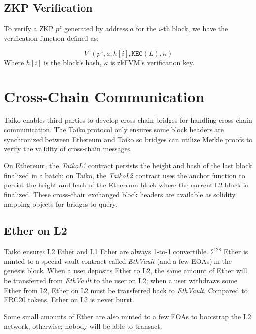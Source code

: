 \documentclass[9pt,oneside]{amsart}
\begin{document}
\begin{multicols}{2}
\subsection{ZKP Verification} To verify a ZKP $p^z$ generated by address $a$ for the $i$-th block, we have the verification function defined as:

\begin{equation}
    V^z(p^z, a, h[i], \texttt{KEC}(L), \kappa)
\end{equation}
Where $h[i]$ is the block's hash, $\kappa$ is  zkEVM's verification key.

\section{Cross-Chain Communication}
Taiko enables third parties to develop cross-chain bridges for handling cross-chain communication. The Taiko protocol only ensures some block headers are synchronized between Ethereum and Taiko so bridges can utilize Merkle proofs to verify the validity of cross-chain messages.

On Ethereum, the \textit{TaikoL1} contract persists the height and hash of the last block finalized in a batch; on Taiko, the \textit{TaikoL2} contract uses the anchor function to persist the height and hash of the Ethereum block where the current L2 block is finalized. These cross-chain exchanged block headers are available as solidity mapping objects for bridges to query.

\subsection{Ether on L2}
Taiko ensures L2 Ether and L1 Ether are always 1-to-1 convertible. $2^128$ Ether is minted to a special vault contract called \textit{EthVault} (and a few EOAs) in the genesis block. When a user deposits Ether to L2, the same amount of Ether will be transferred from \textit{EthVault} to the user on L2; when a user withdraws some Ether from L2, Ether on L2 must be transferred back to \textit{EthVault}. Compared to ERC20 tokens, Ether on L2 is never burnt.

Some small amounts of Ether are also minted to a few EOAs to bootstrap the L2 network, otherwise; nobody will be able to transact.

\end{multicols}




\appendix
\end{document}

